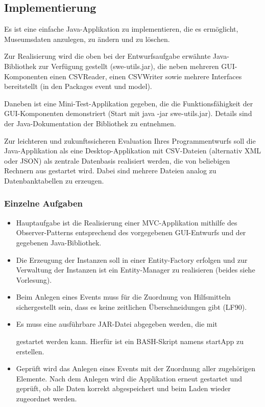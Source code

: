 \subsection{Implementierung}
Es ist eine einfache Java-Applikation zu implementieren, die es ermöglicht, Museumsdaten anzulegen, zu ändern und zu löschen. 

Zur Realisierung wird die oben bei der Entwurfsaufgabe erwähnte Java-Bibliothek zur Verfügung gestellt (swe-utils.jar), die neben mehreren GUI-Komponenten einen CSVReader, einen CSVWriter sowie mehrere Interfaces bereitstellt (in den Packages event und model).

Daneben ist eine Mini-Test-Applikation gegeben, die die Funktionsfähigkeit der GUI-Komponenten demonstriert (Start mit java -jar swe-utils.jar). Details sind der Java-Dokumentation der Bibliothek zu entnehmen.

Zur leichteren und zukunftssicheren Evaluation Ihres Programmentwurfs soll die Java-Applikation als eine Desktop-Applikation mit CSV-Dateien (alternativ XML oder JSON) als zentrale Datenbasis realisiert werden, die von beliebigen Rechnern aus gestartet wird. Dabei sind mehrere Dateien analog zu Datenbanktabellen zu erzeugen.
\subsubsection*{Einzelne Aufgaben}
\begin{itemize}
    \item Hauptaufgabe ist die Realisierung einer MVC-Applikation mithilfe des Observer-Patterns entsprechend des vorgegebenen GUI-Entwurfs und der gegebenen Java-Bibliothek.
    \item Die Erzeugung der Instanzen soll in einer Entity-Factory erfolgen und zur Verwaltung der Instanzen ist ein Entity-Manager zu realisieren (beides siehe Vorlesung).
    \item Beim Anlegen eines Events muss für die Zuordnung von Hilfsmitteln sichergestellt sein, dass es keine zeitlichen Überschneidungen gibt (LF90).
    \item Es muss eine ausführbare JAR-Datei abgegeben werden, die mit 
    
     gestartet werden kann. Hierfür ist ein BASH-Skript namens startApp zu erstellen.
    \item Geprüft wird das Anlegen eines Events mit der Zuordnung aller zugehörigen Elemente. Nach dem Anlegen wird die Applikation erneut gestartet und geprüft, ob alle Daten korrekt abgespeichert und beim Laden wieder zugeordnet werden. 
\end{itemize}

